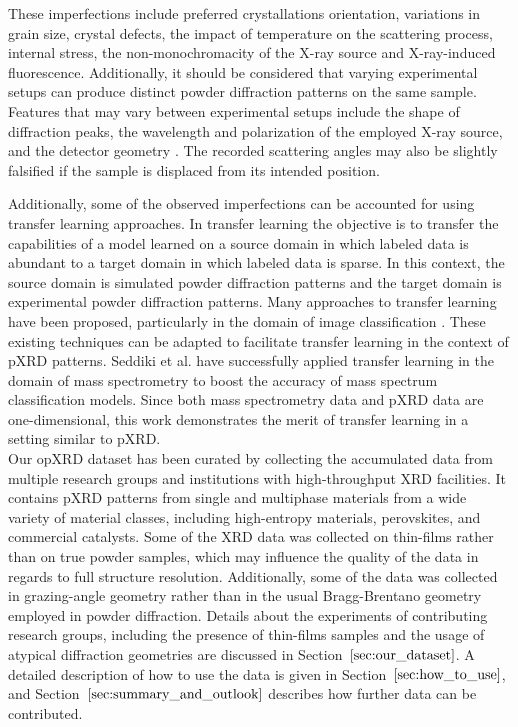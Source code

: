 These imperfections include preferred crystallations orientation, variations in grain size, crystal defects, the impact of temperature on the scattering process, internal stress, the non-monochromacity of the X-ray source and X-ray-induced fluorescence\cite{cao2024simxrd, Waseda2011, Pecharsky2023}. Additionally, it should be considered that varying experimental setups can produce distinct powder diffraction patterns on the same sample. Features that may vary between experimental setups include the shape of diffraction peaks, the wavelength and polarization of the employed X-ray source, and the detector geometry \cite{cao2024simxrd, Waseda2011, Pecharsky2023}. The recorded scattering angles may also be slightly falsified if the sample is displaced from its intended position\cite{cao2024simxrd,hulbert2023}.

Additionally, some of the observed imperfections can be accounted for using transfer learning approaches. In transfer learning the objective is to transfer the capabilities of a model learned on a source domain in which labeled data is abundant to a target domain in which labeled data is sparse\cite{Zhuang2021}. In this context, the source domain is simulated powder diffraction patterns and the target domain is experimental powder diffraction patterns. Many approaches to transfer learning have been proposed, particularly in the domain of image classification \cite{Gatys2016, Ganin2015}. These existing techniques can be adapted to facilitate transfer learning in the context of pXRD patterns. Seddiki et al. have successfully applied transfer learning in the domain of mass spectrometry to boost the accuracy of mass spectrum classification models\cite{Seddiki2020}. Since both mass spectrometry data and pXRD data are one-dimensional, this work demonstrates the merit of transfer learning in a setting similar to pXRD. \\

Our opXRD dataset has been curated by collecting the accumulated data from multiple research groups and institutions with high-throughput XRD facilities. It contains pXRD patterns from single and multiphase materials from a wide variety of material classes, including high-entropy materials, perovskites, and commercial catalysts. Some of the XRD data was collected on thin-films rather than on true powder samples, which may influence the quality of the data in regards to full structure resolution. Additionally, some of the data was collected in grazing-angle geometry rather than in the usual Bragg-Brentano geometry employed in powder diffraction. Details about the experiments of contributing research groups, including the presence of thin-films samples and the usage of atypical diffraction geometries are discussed in Section~$\eqref{sec:our_dataset}$. A detailed description of how to use the data is given in Section~$\eqref{sec:how_to_use}$, and Section~$\eqref{sec:summary_and_outlook}$ describes how further data can be contributed. \\

